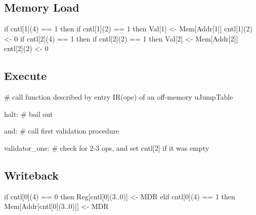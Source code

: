 \documentclass[12pt]{article}
\begin{document}
\subsection{Memory Load}
\begin{verbatimtab}
if cntl[1](4) == 1 then
    if cntl[1](2) == 1 then
        Val[1] <- Mem[Addr[1]]
        cntl[1](2) <- 0
if cntl[2](4) == 1 then
    if cntl[2](2) == 1 then
        Val[2] <- Mem[Addr[2]]
        cntl[2](2) <- 0
\end{verbatimtab}

\subsection{Execute}
\begin{verbatimtab}
# call function described by entry IR(opc) of an off-memory uJumpTable

halt:
# bail out

and:
# call first validation procedure

validator_one:
# check for 2-3 ops, and set cntl[2] if it was empty
\end{verbatimtab}

\subsection{Writeback}
\begin{verbatimtab}
if cntl[0](4) == 0 then
   Reg[cntl[0](3..0)] <- MDR
elif cntl[0](4) == 1 then
   Mem[Addr[cntl[0](3..0)]] <- MDR
\end{verbatimtab}
\end{document}
